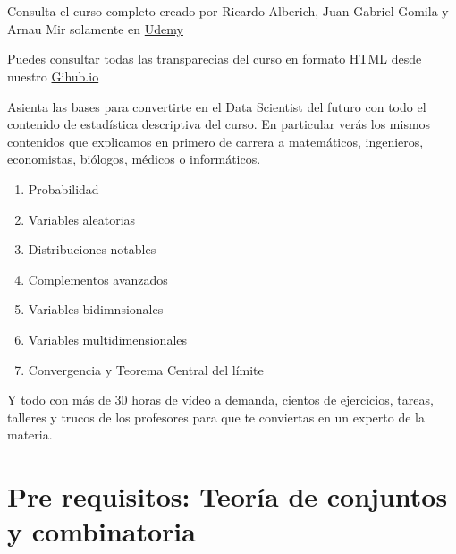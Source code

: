 \documentclass[]{book}
\providecommand{\tightlist}{%
  \setlength{\itemsep}{0pt}\setlength{\parskip}{0pt}}
\begin{document}

{
\setcounter{tocdepth}{1}
\tableofcontents
}
\newcommand{\FunCar}{\phi}
\newcommand{\FunGenMom}{m}
\newcommand{\Momk}{M}
\newcommand{\MomCenk}{MC}
\newcommand\momento{m}
\newcommand{\momentocentral}{\mu}
\newcommand{\Entropia}{H}

\hypertarget{section}{%
\chapter*{}\label{section}}

Consulta el curso completo creado por Ricardo Alberich, Juan Gabriel Gomila y Arnau Mir solamente en \href{https://www.udemy.com/course/probabilidad-y-variables-aleatorias-para-ml-con-r-y-python/?couponCode=B85F8D52148DF5AAD8F7}{Udemy}

Puedes consultar todas las transparecias del curso en formato HTML desde nuestro \href{https://github.com/joanby/probabilidad}{Gihub.io}

Asienta las bases para convertirte en el Data Scientist del futuro con todo el contenido de estadística descriptiva del curso. En particular verás los mismos contenidos que explicamos en primero de carrera a matemáticos, ingenieros, economistas, biólogos, médicos o informáticos.

\begin{enumerate}
\def\labelenumi{\arabic{enumi}.}
\tightlist
\item
  Probabilidad
\item
  Variables aleatorias
\item
  Distribuciones notables
\item
  Complementos avanzados
\item
  Variables bidimnsionales
\item
  Variables multidimensionales
\item
  Convergencia y Teorema Central del límite
\end{enumerate}

Y todo con más de 30 horas de vídeo a demanda, cientos de ejercicios, tareas, talleres y trucos de los profesores para que te conviertas en un experto de la materia.

\hypertarget{pre-requisitos-teoruxeda-de-conjuntos-y-combinatoria}{%
\chapter*{Pre requisitos: Teoría de conjuntos y combinatoria}\label{pre-requisitos-teoruxeda-de-conjuntos-y-combinatoria}}
\end{document}
